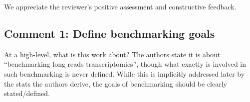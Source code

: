 \documentclass[11pt]{article}
\begin{document}
\begin{responseboxnew}
We appreciate the reviewer's positive assessment and constructive feedback.
\end{responseboxnew}

\subsection{Comment 1: Define benchmarking goals}

\begin{reviewercomment}
    At a high-level, what is this work about? The authors state it is about ``benchmarking
    long reads transcriptomics'', though what exactly is involved in such
    benchmarking is never defined. While this is implicitly addressed later by the
    stats the authors derive, the goals of benchmarking should be clearly stated/defined.
\end{reviewercomment}
\end{document}
